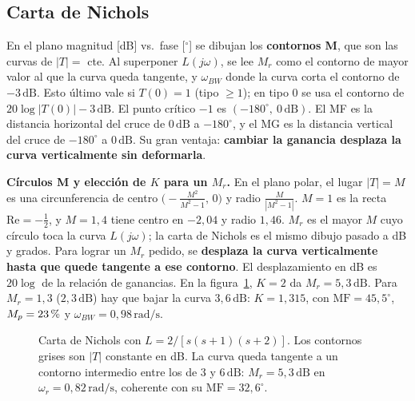 \documentclass[11pt,a4paper]{article}
\newcommand{\pct}{\ensuremath{\,\mathchar"7025}}
\newcommand{\dB}{\,\mathrm{dB}}
\newcommand{\rads}{\,\mathrm{rad/s}}
\newcommand{\jw}{j\omega}
\newcommand{\MF}{\mathrm{MF}}
\begin{document}
\subsection{Carta de Nichols}
En el plano magnitud [dB] vs.\ fase [$^\circ$] se dibujan los \textbf{contornos M}, que son las curvas de $|T|=$ cte.
Al superponer $L(\jw)$, se lee $M_r$ como el contorno de mayor valor al que la curva queda tangente, y $\omega_{BW}$ donde la curva corta el contorno de $-3\dB$.
Esto último vale si $T(0)=1$ (tipo $\ge1$); en tipo 0 se usa el contorno de $20\log|T(0)|-3\dB$.
El punto crítico $-1$ es $(-180^\circ,\ 0\dB)$. El MF es la distancia horizontal del cruce de $0\dB$ a $-180^\circ$, y el MG es la distancia vertical
del cruce de $-180^\circ$ a $0\dB$. Su gran ventaja: \textbf{cambiar la ganancia desplaza la curva verticalmente sin deformarla}.

\textbf{Círculos M y elección de $K$ para un $M_r$.} En el plano polar, el lugar $|T|=M$ es una circunferencia de centro
$\big(-\tfrac{M^2}{M^2-1},\,0\big)$ y radio $\tfrac{M}{|M^2-1|}$. $M=1$ es la recta $\mathrm{Re}=-\tfrac12$, y $M=1{,}4$ tiene centro en $-2{,}04$ y radio $1{,}46$.
$M_r$ es el mayor $M$ cuyo círculo toca la curva $L(\jw)$; la carta de Nichols es el mismo dibujo pasado a dB y grados.
Para lograr un $M_r$ pedido, se \textbf{desplaza la curva verticalmente hasta que quede tangente a ese contorno}. El desplazamiento en dB es
$20\log$ de la relación de ganancias. En la figura~\ref{fig:nichols}, $K=2$ da $M_r=5{,}3\dB$. Para $M_r=1{,}3$ ($2{,}3\dB$) hay que bajar
la curva $3{,}6\dB$: $K=1{,}315$, con $\MF=45{,}5^\circ$, $M_p=23\pct{}$ y $\omega_{BW}=0{,}98\rads$.

\begin{figure}[ht]
\centering
{}
\caption{Carta de Nichols con $L=2/[s(s+1)(s+2)]$. Los contornos grises son $|T|$ constante en dB. La curva queda tangente a un contorno
intermedio entre los de $3$ y $6\dB$: $M_r=5{,}3\dB$ en $\omega_r=0{,}82\rads$, coherente con su $\MF=32{,}6^\circ$.}
\label{fig:nichols}
\end{figure}
\end{document}

